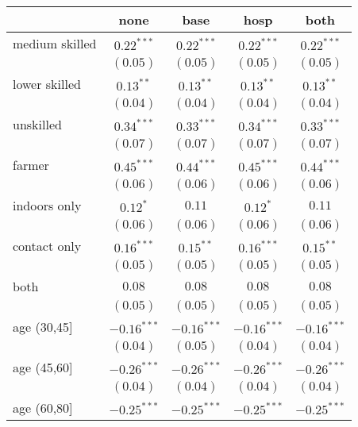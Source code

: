 
\begin{table}
\begin{center}
\begin{small}
\begin{tabular}{l c c c c}
\hline
 & none & base & hosp & both \\
\hline
medium skilled     & $0.22^{***}$  & $0.22^{***}$  & $0.22^{***}$  & $0.22^{***}$  \\
                   & $(0.05)$      & $(0.05)$      & $(0.05)$      & $(0.05)$      \\
lower skilled      & $0.13^{**}$   & $0.13^{**}$   & $0.13^{**}$   & $0.13^{**}$   \\
                   & $(0.04)$      & $(0.04)$      & $(0.04)$      & $(0.04)$      \\
unskilled          & $0.34^{***}$  & $0.33^{***}$  & $0.34^{***}$  & $0.33^{***}$  \\
                   & $(0.07)$      & $(0.07)$      & $(0.07)$      & $(0.07)$      \\
farmer             & $0.45^{***}$  & $0.44^{***}$  & $0.45^{***}$  & $0.44^{***}$  \\
                   & $(0.06)$      & $(0.06)$      & $(0.06)$      & $(0.06)$      \\
indoors only       & $0.12^{*}$    & $0.11$        & $0.12^{*}$    & $0.11$        \\
                   & $(0.06)$      & $(0.06)$      & $(0.06)$      & $(0.06)$      \\
contact only       & $0.16^{***}$  & $0.15^{**}$   & $0.16^{***}$  & $0.15^{**}$   \\
                   & $(0.05)$      & $(0.05)$      & $(0.05)$      & $(0.05)$      \\
both               & $0.08$        & $0.08$        & $0.08$        & $0.08$        \\
                   & $(0.05)$      & $(0.05)$      & $(0.05)$      & $(0.05)$      \\
age (30,45]        & $-0.16^{***}$ & $-0.16^{***}$ & $-0.16^{***}$ & $-0.16^{***}$ \\
                   & $(0.04)$      & $(0.05)$      & $(0.04)$      & $(0.04)$      \\
age (45,60]        & $-0.26^{***}$ & $-0.26^{***}$ & $-0.26^{***}$ & $-0.26^{***}$ \\
                   & $(0.04)$      & $(0.04)$      & $(0.04)$      & $(0.04)$      \\
age (60,80]        & $-0.25^{***}$ & $-0.25^{***}$ & $-0.25^{***}$ & $-0.25^{***}$ \\

\end{tabular}
\end{small}
\end{center}
\end{table}
